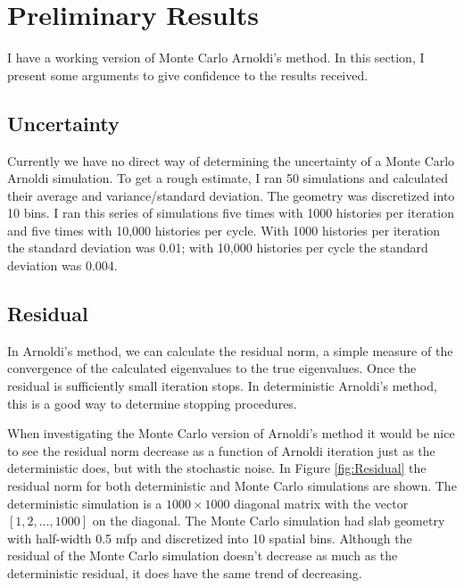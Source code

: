 \documentclass[12pt]{article}
\begin{document}
\section{Preliminary Results}
I have a working version of Monte Carlo Arnoldi's method.  In this section, I present some arguments to give confidence to the results received.  

\subsection{Uncertainty}
Currently we have no direct way of determining the uncertainty of a Monte Carlo Arnoldi simulation.  To get a rough estimate, I ran 50 simulations and calculated their average and variance/standard deviation.  The geometry was discretized into 10 bins.  I ran this series of simulations five times with 1000 histories per iteration and five times with 10,000 histories per cycle.  With 1000 histories per iteration the standard deviation was 0.01; with 10,000 histories per cycle the standard deviation was 0.004.

\subsection{Residual}
In Arnoldi's method, we can calculate the residual norm, a simple measure of the convergence of the calculated eigenvalues to the true eigenvalues.  Once the residual is sufficiently small iteration stops.  In deterministic Arnoldi's method, this is a good way to determine stopping procedures. 

When investigating the Monte Carlo version of Arnoldi's method it would be nice to see the residual norm decrease as a function of Arnoldi iteration just as the deterministic does, but with the stochastic noise.  In Figure \ref{fig:Residual} the residual norm for both deterministic and Monte Carlo simulations are shown.  The deterministic simulation is a $1000 \times 1000$ diagonal matrix with the vector $[1,2,\ldots, 1000]$ on the diagonal.  The Monte Carlo simulation had slab geometry with half-width 0.5 mfp and discretized into 10 spatial bins.  Although the residual of the Monte Carlo simulation doesn't decrease as much as the deterministic residual, it does have the same trend of decreasing.
\end{document}
